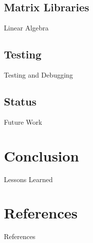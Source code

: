 \documentclass[aspectratio=169,handout]{beamer}
\begin{document}
\subsection{Matrix Libraries}
	\begin{frame}{Linear Algebra}
	\end{frame}

\subsection{Testing}
	\begin{frame}{Testing and Debugging}
	\end{frame}

\subsection{Status}
	\begin{frame}{Future Work}
	\end{frame}

\section{Conclusion}%
	\begin{frame}{Lessons Learned}
	\end{frame}

\section{References}%

	\begin{frame}[t]{References}
			\footnotesize
			 
	\end{frame}
\end{document}
